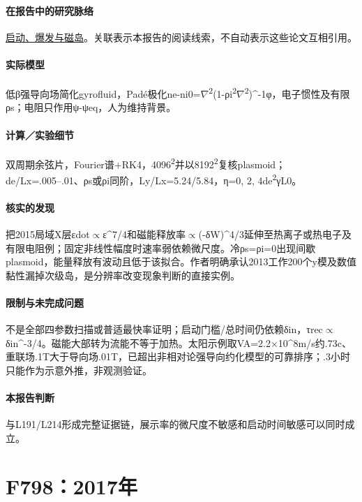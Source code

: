 \paragraph{在报告中的研究脉络}\hyperref[story:onset]{启动、爆发与磁岛}。关联表示本报告的阅读线索，不自动表示这些论文互相引用。

\paragraph{实际模型}低β强导向场简化gyrofluid，Padé极化ne-ni0=\ensuremath{\nabla}\textsuperscript{2}(1-ρi\textsuperscript{2}\ensuremath{\nabla}\textsuperscript{2})\textasciicircum{}-1φ，电子惯性及有限ρs；电阻只作用ψ-ψeq，人为维持背景。

\paragraph{计算／实验细节}双周期余弦片，Fourier谱+RK4，4096\textsuperscript{2}并以8192\textsuperscript{2}复核plasmoid；de/Lx=.005–.01、ρs或ρi同阶，Ly/Lx=5.24/5.84，η=0, 2, 4de\textsuperscript{2}γL0。

\paragraph{核实的发现}把2015局域X层εdot\ensuremath{\propto}ε\textasciicircum{}7/4和磁能释放率\ensuremath{\propto}(-δW)\textasciicircum{}4/3延伸至热离子或热电子及有限电阻例；固定非线性幅度时速率弱依赖微尺度。冷ρs=ρi=0出现间歇plasmoid，能量释放有波动且低于该拟合。作者明确承认2013工作200个y模及数值黏性漏掉次级岛，是分辨率改变现象判断的直接实例。

\paragraph{限制与未完成问题}不是全部四参数扫描或普适最快率证明；启动门槛/总时间仍依赖δin，τrec\ensuremath{\propto}δin\textasciicircum{}-3/4。磁能大部转为流能不等于加热。太阳示例取VA=2.2×10\textasciicircum{}8m/s约.73c、重联场.1T大于导向场.01T，已超出非相对论强导向约化模型的可靠排序；.3小时只能作为示意外推，非观测验证。

\paragraph{本报告判断}与L191/L214形成完整证据链，展示率的微尺度不敏感和启动时间敏感可以同时成立。

\section{F798：2017年}\label{paper:F798}

